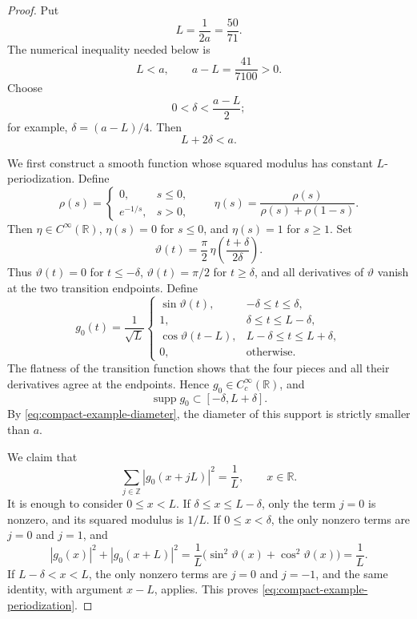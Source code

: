 \documentclass[11pt,reqno]{amsart}
\numberwithin{equation}{section}
\theoremstyle{definition}
\theoremstyle{remark}
\newcommand{\R}{\mathbb R}
\newcommand{\Z}{\mathbb Z}
\newcommand{\supp}{\operatorname{supp}}
\begin{document}
\begin{proof}
Put
\[
 L=\frac1{2a}=\frac{50}{71}.
\]
The numerical inequality needed below is
\[
 L<a,
 \qquad
 a-L=\frac{41}{7100}>0.
\]
Choose
\[
 0<\delta<\frac{a-L}{2};
\]
for example, $\delta=(a-L)/4$.  Then
\begin{equation}\label{eq:compact-example-diameter}
 L+2\delta<a.
\end{equation}

We first construct a smooth function whose squared modulus has constant
$L$-periodization.  Define
\[
 \rho(s)=
 \begin{cases}
  0,&s\le0,\\
  e^{-1/s},&s>0,
 \end{cases}
 \qquad
 \eta(s)=\frac{\rho(s)}{\rho(s)+\rho(1-s)}.
\]
Then $\eta\in C^\infty(\R)$, $\eta(s)=0$ for $s\le0$, and
$\eta(s)=1$ for $s\ge1$.  Set
\[
 \vartheta(t)=\frac\pi2\,
 \eta\!\left(\frac{t+\delta}{2\delta}\right).
\]
Thus $\vartheta(t)=0$ for $t\le-\delta$,
$\vartheta(t)=\pi/2$ for $t\ge\delta$, and all derivatives of
$\vartheta$ vanish at the two transition endpoints.  Define
\begin{equation}\label{eq:compact-example-window}
 g_0(t)=\frac1{\sqrt L}
 \begin{cases}
  \sin\vartheta(t),&-\delta\le t\le\delta,\\
  1,&\delta\le t\le L-\delta,\\
  \cos\vartheta(t-L),&L-\delta\le t\le L+\delta,\\
  0,&\text{otherwise}.
 \end{cases}
\end{equation}
The flatness of the transition function shows that the four pieces and all
their derivatives agree at the endpoints.  Hence
$g_0\in C_c^\infty(\R)$, and
\[
 \supp g_0\subset[-\delta,L+\delta].
\]
By \eqref{eq:compact-example-diameter}, the diameter of this support is
strictly smaller than $a$.

We claim that
\begin{equation}\label{eq:compact-example-periodization}
 \sum_{j\in\Z}|g_0(x+jL)|^2=\frac1L,
 \qquad x\in\R.
\end{equation}
It is enough to consider $0\le x<L$.  If
$\delta\le x\le L-\delta$, only the term $j=0$ is nonzero, and its
squared modulus is $1/L$.  If $0\le x<\delta$, the only nonzero terms are
$j=0$ and $j=1$, and
\[
 |g_0(x)|^2+|g_0(x+L)|^2
 =\frac1L\bigl(\sin^2\vartheta(x)+\cos^2\vartheta(x)\bigr)
 =\frac1L.
\]
If $L-\delta<x<L$, the only nonzero terms are $j=0$ and $j=-1$, and the
same identity, with argument $x-L$, applies.  This proves
\eqref{eq:compact-example-periodization}.


\end{proof}
\end{document}
